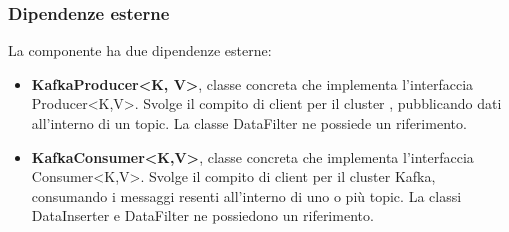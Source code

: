 		\subsubsection{Dipendenze esterne}
			La componente ha due dipendenze esterne:
			\begin{itemize}
				\item \textbf{KafkaProducer<K, V>}, classe concreta che implementa l'interfaccia Producer<K,V>. Svolge il compito di client per il cluster , pubblicando dati all'interno di un topic. La classe DataFilter ne possiede un riferimento.
				\item \textbf{KafkaConsumer<K,V>}, classe concreta che implementa l'interfaccia Consumer<K,V>. Svolge il compito di client per il cluster Kafka, consumando i messaggi resenti all'interno di uno o più topic. La classi DataInserter e DataFilter ne possiedono un riferimento.	
			\end{itemize}	
